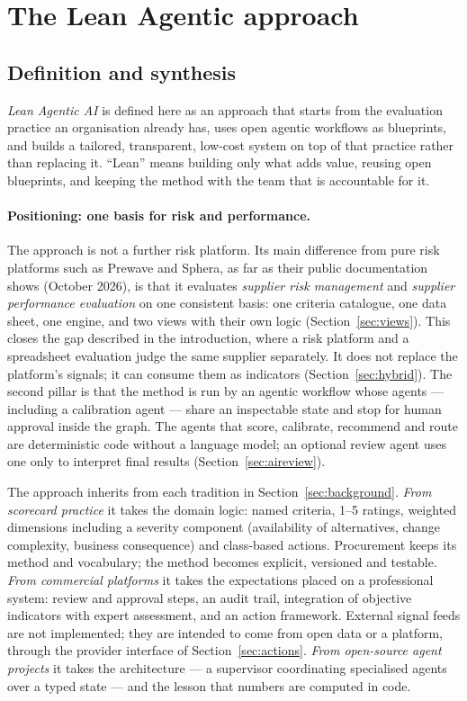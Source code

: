 \documentclass[10pt,twocolumn,a4paper]{article}
\begin{document}
\section{The Lean Agentic approach}
\label{sec:approach}

\subsection{Definition and synthesis}
\emph{Lean Agentic AI} is defined here as an approach that starts from the evaluation
practice an organisation already has, uses open agentic workflows as blueprints, and
builds a tailored, transparent, low-cost system on top of that practice rather than
replacing it. ``Lean'' means building only what adds value, reusing open blueprints, and
keeping the method with the team that is accountable for it.

\paragraph{Positioning: one basis for risk and performance.} The approach is not a
further risk platform. Its main difference from pure risk platforms such as Prewave and
Sphera, as far as their public documentation shows (October 2026), is that it evaluates \emph{supplier risk management} and \emph{supplier
performance evaluation} on one consistent basis: one criteria catalogue, one data sheet,
one engine, and two views with their own logic (Section~\ref{sec:views}). This closes the
gap described in the introduction, where a risk platform and a spreadsheet evaluation
judge the same supplier separately. It does not replace the platform's signals; it can
consume them as indicators (Section~\ref{sec:hybrid}). The second pillar is that the
method is run by an agentic workflow whose agents --- including a calibration agent ---
share an inspectable state and stop for human approval inside the graph. The agents that
score, calibrate, recommend and route are deterministic code without a language model; an
optional review agent uses one only to interpret final results
(Section~\ref{sec:aireview}).

The approach inherits from each tradition in Section~\ref{sec:background}. \emph{From
scorecard practice} it takes the domain logic: named criteria, 1--5 ratings, weighted
dimensions including a severity component (availability of alternatives, change
complexity, business consequence) and class-based actions. Procurement keeps its method
and vocabulary; the method becomes explicit, versioned and testable. \emph{From
commercial platforms} it takes the expectations placed on a professional system: review
and approval steps, an audit trail, integration of objective indicators with expert
assessment, and an action framework. External signal feeds are not implemented; they
are intended to come from open data or a platform, through the provider interface of
Section~\ref{sec:actions}. \emph{From open-source agent projects} it takes the
architecture --- a supervisor coordinating specialised agents over a typed state --- and
the lesson that numbers are computed in code.
\end{document}
